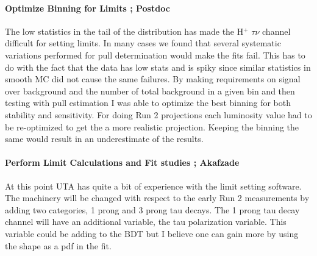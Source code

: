 
\paragraph{Optimize Binning for Limits ;  Postdoc} %
The low statistics in the tail of the distribution has made the H$^+$ \too $\tau \nu$ channel difficult for setting limits.  In many cases we found that several systematic variations performed for pull determination would make the fits fail.  
This has to do with the fact that the data has low stats and is spiky since similar statistics in smooth MC did not cause the same failures.  By making requirements on signal over background and the number of total background in a given
bin and then testing with pull estimation I was able to optimize the best binning for both stability and sensitivity.  For doing Run 2 projections each luminosity value had to be re-optimized to get the a more realistic projection.
Keeping the binning the same would result in an underestimate of the results. 

\paragraph{Perform Limit Calculations and Fit studies ;  Akafzade}%
At this point UTA has quite a bit of experience with the limit setting software. The machinery will be changed with respect to the early Run 2 measurements by adding 
two categories, 1 prong and 3 prong tau decays.  The 1 prong tau decay channel will have an additional variable, the tau polarization variable.  This variable could be adding to the BDT 
but I believe one can gain more by using the shape as a pdf in the fit.

